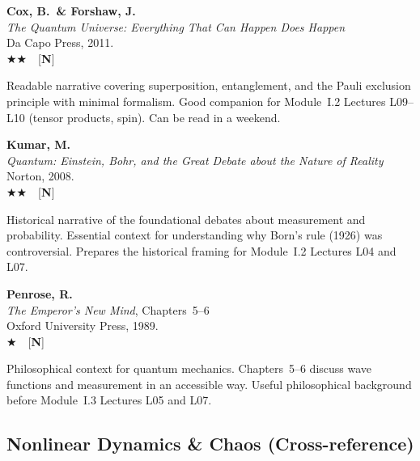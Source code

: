 \documentclass[11pt,a4paper]{article}
\newcommand{\recommended}{$\bigstar\bigstar$}
\newcommand{\useful}{$\bigstar$}
\newenvironment{bibentry}[1]{%
  \begin{tcolorbox}[entrybox=#1, top=4pt, bottom=4pt]%
}{%
  \end{tcolorbox}\smallskip%
}
\begin{document}
\begin{bibentry}{t1light}
\textbf{Cox, B.\ \& Forshaw, J.}\\
\textit{The Quantum Universe: Everything That Can Happen Does Happen}\\
Da Capo Press, 2011.\\[4pt]
\recommended\ \ [\textbf{N}]\\[4pt]
\begin{tcolorbox}[annotbox]
Readable narrative covering superposition, entanglement, and the Pauli exclusion
principle with minimal formalism. Good companion for Module~I.2 Lectures L09--L10
(tensor products, spin). Can be read in a weekend.
\end{tcolorbox}
\end{bibentry}

\begin{bibentry}{t1light}
\textbf{Kumar, M.}\\
\textit{Quantum: Einstein, Bohr, and the Great Debate about the Nature of Reality}\\
Norton, 2008.\\[4pt]
\recommended\ \ [\textbf{N}]\\[4pt]
\begin{tcolorbox}[annotbox]
Historical narrative of the foundational debates about measurement and probability.
Essential context for understanding why Born's rule (1926) was controversial. Prepares
the historical framing for Module~I.2 Lectures L04 and L07.
\end{tcolorbox}
\end{bibentry}

\begin{bibentry}{t1light}
\textbf{Penrose, R.}\\
\textit{The Emperor's New Mind}, Chapters~5--6\\
Oxford University Press, 1989.\\[4pt]
\useful\ \ [\textbf{N}]\\[4pt]
\begin{tcolorbox}[annotbox]
Philosophical context for quantum mechanics. Chapters~5--6 discuss wave functions and
measurement in an accessible way. Useful philosophical background before Module~I.3
Lectures L05 and L07.
\end{tcolorbox}
\end{bibentry}

\subsection{Nonlinear Dynamics \& Chaos (Cross-reference)}
\end{document}

